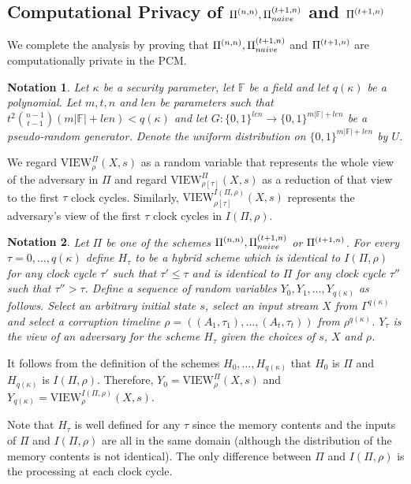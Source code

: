 \documentclass[letterpaper,11pt]{article}
\newcommand{\abs}[1]{\left| #1\right|}
\newcommand{\nnPi}{{\rm {\Pi}}^{(n,n)}}
\newcommand{\tnPiNaive}{{\rm {\Pi}}^{(t+1,n)}_{naive}}
\newcommand{\tnPi}{{\rm {\Pi}}^{(t+1,n)}}
\newtheorem{notation}{Notation}
\begin{document}
\subsection{Computational Privacy of $\nnPi, \tnPiNaive$ and $\tnPi$}

We complete the analysis by proving that $\nnPi, \tnPiNaive$ and $\tnPi$ are computationally private in the PCM. 

\begin{notation}
Let $\kappa$ be a security parameter, let $\mathbb{F}$ be a field and let $q(\kappa)$ be a polynomial. Let $m, t, n$ and $len$ be parameters such that $t^2{n-1 \choose t-1}(m\abs{\mathbb{F}}+len) < q(\kappa)$ and let $G:\{0,1\}^{len} \longrightarrow \{0,1\}^{m\abs{\mathbb{F}}+len}$ be a pseudo-random generator. Denote the uniform distribution on $\{0,1\}^{m\abs{\mathbb{F}}+len}$ by $U$. 

\end{notation}

We regard $\mbox{VIEW}_{\rho}^{\Pi}(X, s)$ as a random variable that represents the whole view of the adversary in $\Pi$ and regard $\mbox{VIEW}_{\rho[\tau]}^{\Pi}(X, s)$ as a reduction of that view to the first $\tau$ clock cycles. Similarly, $\mbox{VIEW}_{\rho[\tau]}^{I(\Pi,\rho)}(X, s)$ represents the adversary's view of the first $\tau$ clock cycles in $I(\Pi,\rho)$.

\begin{notation}
Let $\Pi$ be one of the schemes $\nnPi,\tnPiNaive$ or $\tnPi$. For every $\tau=0,\ldots,q(\kappa)$ define $H_{\tau}$ to be a hybrid scheme which is identical to $I(\Pi,\rho)$ for any clock cycle $\tau'$ such that $\tau' \leq \tau$ and is identical to $\Pi$ for any clock cycle $\tau''$ such that $\tau'' > \tau$. Define a sequence of random variables $Y_0, Y_1, \ldots,Y_{q(\kappa)}$ as follows. Select an arbitrary initial state $s$, select an input stream $X$ from $\Gamma^{q(\kappa)}$ and select a corruption timeline $\rho=((A_1,\tau_1),\ldots,(A_t,\tau_t))$ from $\rho^{q(\kappa)}$. $Y_{\tau}$ is the view of an adversary for the scheme $H_{\tau}$ given the choices of $s$, $X$ and $\rho$.
\end{notation}

It follows from the definition of the schemes $H_0,\ldots,H_{q(\kappa)}$ that $H_0$ is $\Pi$ and $H_{q(\kappa)}$ is $I(\Pi,\rho)$. Therefore, $Y_0=\mbox{VIEW}_{\rho}^{\Pi}(X, s)$ and $Y_{q(\kappa)}=\mbox{VIEW}_{\rho}^{I(\Pi,\rho)}(X, s)$. 

Note that $H_{\tau}$ is well defined for any $\tau$ since the memory contents and the inputs of $\Pi$ and $I(\Pi, \rho)$ are all in the same domain (although the distribution of the memory contents is not identical). The only difference between $\Pi$ and $I(\Pi, \rho)$ is the processing at each clock cycle. 
\end{document}
